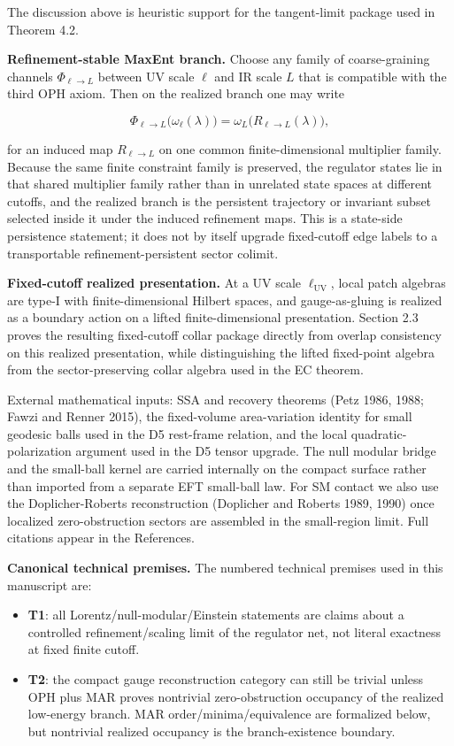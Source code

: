 The discussion above is heuristic support for the tangent-limit package used in Theorem 4.2.

\textbf{Refinement-stable MaxEnt branch.} Choose any family of coarse-graining channels \(\Phi_{\ell\to L}\) between UV scale \(\ell\) and IR scale \(L\) that is compatible with the third OPH axiom. Then on the realized branch one may write

\[
\Phi_{\ell\to L}\bigl(\omega_{\ell}(\lambda)\bigr)=\omega_{L}\!\bigl(R_{\ell\to L}(\lambda)\bigr),
\]

for an induced map \(R_{\ell\to L}\) on one common finite-dimensional multiplier family. Because the same finite constraint family is preserved, the regulator states lie in that shared multiplier family rather than in unrelated state spaces at different cutoffs, and the realized branch is the persistent trajectory or invariant subset selected inside it under the induced refinement maps. This is a state-side persistence statement; it does not by itself upgrade fixed-cutoff edge labels to a transportable refinement-persistent sector colimit.

\textbf{Fixed-cutoff realized presentation.} At a UV scale \(\ell_{\mathrm{UV}}\), local patch algebras are type-I with finite-dimensional Hilbert spaces, and gauge-as-gluing is realized as a boundary action on a lifted finite-dimensional presentation. Section 2.3 proves the resulting fixed-cutoff collar package directly from overlap consistency on this realized presentation, while distinguishing the lifted fixed-point algebra from the sector-preserving collar algebra used in the EC theorem.

External mathematical inputs: SSA and recovery theorems (Petz 1986, 1988; Fawzi and Renner 2015), the fixed-volume area-variation identity for small geodesic balls used in the D5 rest-frame relation, and the local quadratic-polarization argument used in the D5 tensor upgrade. The null modular bridge and the small-ball kernel are carried internally on the compact surface rather than imported from a separate EFT small-ball law. For SM contact we also use the Doplicher-Roberts reconstruction (Doplicher and Roberts 1989, 1990) once localized zero-obstruction sectors are assembled in the small-region limit. Full citations appear in the References.

\textbf{Canonical technical premises.} The numbered technical premises used in this manuscript are:
\begin{itemize}
\tightlist
\item \textbf{T1}: all Lorentz/null-modular/Einstein statements are claims about a controlled refinement/scaling limit of the regulator net, not literal exactness at fixed finite cutoff.
\item \textbf{T2}: the compact gauge reconstruction category can still be trivial unless OPH plus MAR proves nontrivial zero-obstruction occupancy of the realized low-energy branch. MAR order/minima/equivalence are formalized below, but nontrivial realized occupancy is the branch-existence boundary.
\end{itemize}

